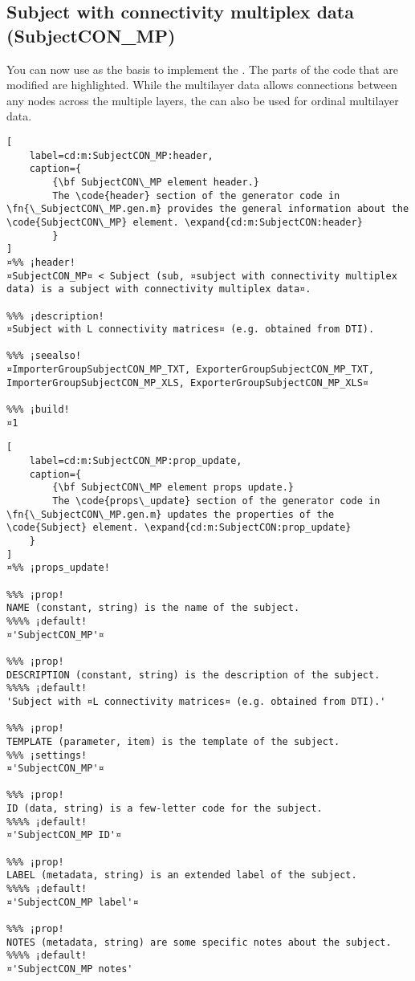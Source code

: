 \documentclass{tufte-handout}
\begin{document}
\clearpage

\subsection{Subject with connectivity multiplex data (SubjectCON\_MP)}

You can now use  as the basis to implement the . 
{%
The parts of the code that are modified are highlighted.
}%
While the multilayer data allows connections between any nodes across the multiple layers, the  can also be used for ordinal multilayer data.

\begin{lstlisting}[
	label=cd:m:SubjectCON_MP:header,
	caption={
		{\bf SubjectCON\_MP element header.}
		The \code{header} section of the generator code in \fn{\_SubjectCON\_MP.gen.m} provides the general information about the \code{SubjectCON\_MP} element. \expand{cd:m:SubjectCON:header}
		}
]
¤%% ¡header!
¤SubjectCON_MP¤ < Subject (sub, ¤subject with connectivity multiplex data) is a subject with connectivity multiplex data¤.

%%% ¡description!
¤Subject with L connectivity matrices¤ (e.g. obtained from DTI).

%%% ¡seealso!
¤ImporterGroupSubjectCON_MP_TXT, ExporterGroupSubjectCON_MP_TXT, ImporterGroupSubjectCON_MP_XLS, ExporterGroupSubjectCON_MP_XLS¤

%%% ¡build!
¤1
\end{lstlisting}

\begin{lstlisting}[
	label=cd:m:SubjectCON_MP:prop_update,
	caption={
		{\bf SubjectCON\_MP element props update.}
		The \code{props\_update} section of the generator code in \fn{\_SubjectCON\_MP.gen.m} updates the properties of the \code{Subject} element. \expand{cd:m:SubjectCON:prop_update}
	}
]
¤%% ¡props_update!

%%% ¡prop!
NAME (constant, string) is the name of the subject.
%%%% ¡default!
¤'SubjectCON_MP'¤

%%% ¡prop!
DESCRIPTION (constant, string) is the description of the subject.
%%%% ¡default!
'Subject with ¤L connectivity matrices¤ (e.g. obtained from DTI).'

%%% ¡prop!
TEMPLATE (parameter, item) is the template of the subject.
%%% ¡settings!
¤'SubjectCON_MP'¤

%%% ¡prop!
ID (data, string) is a few-letter code for the subject.
%%%% ¡default!
¤'SubjectCON_MP ID'¤

%%% ¡prop!
LABEL (metadata, string) is an extended label of the subject.
%%%% ¡default!
¤'SubjectCON_MP label'¤

%%% ¡prop!
NOTES (metadata, string) are some specific notes about the subject.
%%%% ¡default!
¤'SubjectCON_MP notes'
\end{lstlisting}
\end{document}
